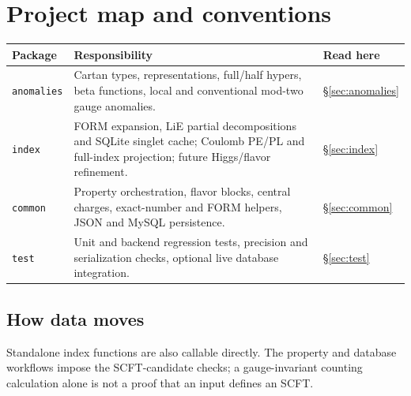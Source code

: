 \documentclass[11pt,a4paper]{article}
\numberwithin{equation}{section}
\newcommand{\code}[1]{{\small\nolinkurl{#1}}}
\begin{document}
\section{Project map and conventions}\label{sec:map}
\begin{tabularx}{\textwidth}{@{}p{25mm}Yp{21mm}@{}}
\toprule
Package & Responsibility & Read here\\\midrule
\code{anomalies} & Cartan types, representations, full/half hypers, beta functions,
local and conventional mod-two gauge anomalies. & \S\ref{sec:anomalies}\\
\code{index} & FORM expansion, LiE partial decompositions and SQLite singlet cache; Coulomb PE/PL and
full-index projection; future Higgs/flavor refinement. & \S\ref{sec:index}\\
\code{common} & Property orchestration, flavor blocks, central charges, exact-number
and FORM helpers, JSON and MySQL persistence. & \S\ref{sec:common}\\
\code{test} & Unit and backend regression tests, precision and serialization checks,
optional live database integration. & \S\ref{sec:test}\\\bottomrule
\end{tabularx}

\subsection*{How data moves}
\begin{center}
\end{center}
Standalone index functions are also callable directly. The property and database
workflows impose the SCFT-candidate checks; a gauge-invariant counting calculation
alone is not a proof that an input defines an SCFT.
\end{document}
